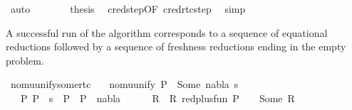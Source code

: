 \begin{isabellebody}
\ auto\isanewline
\ \ \ \ \isamarkupfalse%
\ \isamarkupfalse%
\ {\isacharquery}{\kern0pt}thesis\ \isamarkupfalse%
\ cred{\isacharunderscore}{\kern0pt}step{\isacharbrackleft}{\kern0pt}OF\ cred{\isacharunderscore}{\kern0pt}rtc{\isacharunderscore}{\kern0pt}step{\isacharparenleft}{\kern0pt}{}{\isacharparenright}{\kern0pt}{\isacharbrackright}{\kern0pt}\ \isamarkupfalse%
\ simp\isanewline
\ \ \isamarkupfalse%
\isanewline
{}\isamarkupfalse%
%
\endisatagproof
{\isafoldproof}%
%
\isadelimproof
%
\endisadelimproof
%
\begin{isamarkuptext}%
A successful run of the algorithm corresponds to a sequence of equational reductions 
followed by a sequence of freshness reductions ending in the empty problem.%
\end{isamarkuptext}\isamarkuptrue%
\isamarkupfalse%
\ nomu{\isacharunderscore}{\kern0pt}unify{\isacharunderscore}{\kern0pt}some{\isacharunderscore}{\kern0pt}rtc{\isacharcolon}{\kern0pt}\isanewline
\ \ \ {\isachardoublequoteopen}nomu{\isacharunderscore}{\kern0pt}unify\ P\ {\isacharequal}{\kern0pt}\ Some\ {\isacharparenleft}{\kern0pt}nabla{\isacharcomma}{\kern0pt}\ s{\isacharparenright}{\kern0pt}{\isachardoublequoteclose}\isanewline
\ \ \ {\isachardoublequoteopen}{\isasymexists}P{}{\isachardot}{\kern0pt}\ P\ {\isasymturnstile}\ s\ {\isasymleadsto}\isactrlsup {\isacharasterisk}{\kern0pt}\ P{}\ {\isasymand}\ P{}\ {\isasymturnstile}\ nabla\ {\isasymrightarrow}\isactrlsup {\isacharasterisk}{\kern0pt}\ {\isacharparenleft}{\kern0pt}{\isacharbrackleft}{\kern0pt}{\isacharbrackright}{\kern0pt}{\isacharcomma}{\kern0pt}{\isacharbrackleft}{\kern0pt}{\isacharbrackright}{\kern0pt}{\isacharparenright}{\kern0pt}{\isachardoublequoteclose}\isanewline
%
\isadelimproof
%
\endisadelimproof
%
\isatagproof
{}\isamarkupfalse%
{\isacharminus}{\kern0pt}\isanewline
\ \ \isamarkupfalse%
\ R\ \ R{\isacharcolon}{\kern0pt}\ {\isachardoublequoteopen}red{\isacharunderscore}{\kern0pt}plus{\isacharunderscore}{\kern0pt}fun\ {\isacharparenleft}{\kern0pt}P{\isacharcomma}{\kern0pt}\ {\isacharbraceleft}{\kern0pt}{\isacharbraceright}{\kern0pt}{\isacharcomma}{\kern0pt}\ {\isacharbrackleft}{\kern0pt}{\isacharbrackright}{\kern0pt}{\isacharparenright}{\kern0pt}\ {\isacharequal}{\kern0pt}\ Some\ R{\isachardoublequoteclose}\isanewline
\ \ \ \ \isamarkupfalse%

\end{isabellebody}
